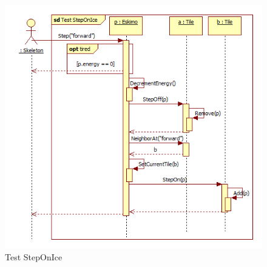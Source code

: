 \begin{figure}[h]
	\begin{center}
		\includegraphics[width=17cm]{chapters/chapter05/diagrams/Test_StepOnIce.png}
		\caption{Test StepOnIce}
		\label{fig:Test StepOnIce}
	\end{center}
\end{figure}

